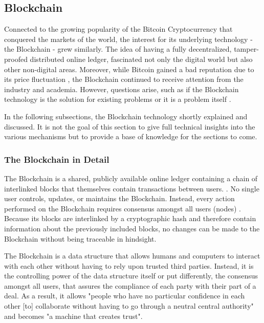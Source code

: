 \subsection{Blockchain}
\label{subsec:02_Blockchain}

Connected to the growing popularity of the Bitcoin Cryptocurrency that conquered the markets of the world, the interest for its underlying technology - the Blockchain - grew similarly. The idea of having a fully decentralized, tamper-proofed distributed online ledger, fascinated not only the digital world but also other non-digital areas. Moreover, while Bitcoin gained a bad reputation due to its price fluctuation \cite{Shackelford2016}, the Blockchain continued to receive attention from the industry and academia. However, questions arise, such as if the Blockchain technology is the solution for existing problems or it is a problem itself \cite{Stinchcombe2017, Nielsen2018, Lunn2015}.

In the following subsections, the Blockchain technology shortly explained and discussed. It is not the goal of this section to give full technical insights into the various mechanisms but to provide a base of knowledge for the sections to come.

\subsubsection{The Blockchain in Detail}
The Blockchain is a shared, publicly available online ledger containing a chain of interlinked blocks that themselves contain transactions between users. \cite{Wust2017}. No single user controls, updates, or maintains the Blockchain. Instead, every action performed on the Blockchain requires consensus amongst all users (nodes) \cite{Shackelford2016}. Because its blocks are interlinked by a cryptographic hash and therefore contain information about the previously included blocks, no changes can be made to the Blockchain without being traceable in hindsight.

The Blockchain is a data structure that allows humans and computers to interact with each other without having to rely upon trusted third parties. Instead, it is the controlling power of the data structure itself or put differently, the consensus amongst all users, that assures the compliance of each party with their part of a deal. As a result, it allows "people who have no particular confidence in each other [to] collaborate without having to go through a neutral central authority" and becomes "a machine that creates trust". \cite{Economist2015} \cite{Shackelford2016}


